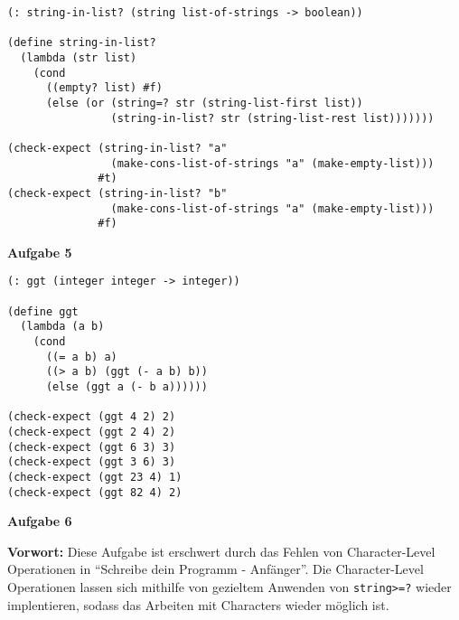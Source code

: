 \documentclass[a4paper,12pt]{article}
\newcommand{\Aufgabe}[1]{
  {
  \vspace*{0.5cm}
  \textsf{\textbf{Aufgabe #1}}
  \vspace*{0.2cm}

  }
}
\begin{document}
\begin{enumerate}[a)]
\begin{verbatim}
(: string-in-list? (string list-of-strings -> boolean))

(define string-in-list?
  (lambda (str list)
    (cond
      ((empty? list) #f)
      (else (or (string=? str (string-list-first list))
                (string-in-list? str (string-list-rest list)))))))

(check-expect (string-in-list? "a"
                (make-cons-list-of-strings "a" (make-empty-list)))
              #t)
(check-expect (string-in-list? "b"
                (make-cons-list-of-strings "a" (make-empty-list)))
              #f)
\end{verbatim}
\end{enumerate}

\Aufgabe{5}

\begin{verbatim}
(: ggt (integer integer -> integer))

(define ggt
  (lambda (a b)
    (cond
      ((= a b) a)
      ((> a b) (ggt (- a b) b))
      (else (ggt a (- b a))))))

(check-expect (ggt 4 2) 2)
(check-expect (ggt 2 4) 2)
(check-expect (ggt 6 3) 3)
(check-expect (ggt 3 6) 3)
(check-expect (ggt 23 4) 1)
(check-expect (ggt 82 4) 2)
\end{verbatim}

\Aufgabe{6}

\textbf{Vorwort: } Diese Aufgabe ist erschwert durch das Fehlen von Character-Level
Operationen in ``Schreibe dein Programm - Anfänger''. Die Character-Level Operationen
lassen sich mithilfe von gezieltem Anwenden von \texttt{string>=?} wieder
implentieren, sodass das Arbeiten mit Characters wieder möglich ist.
\end{document}
